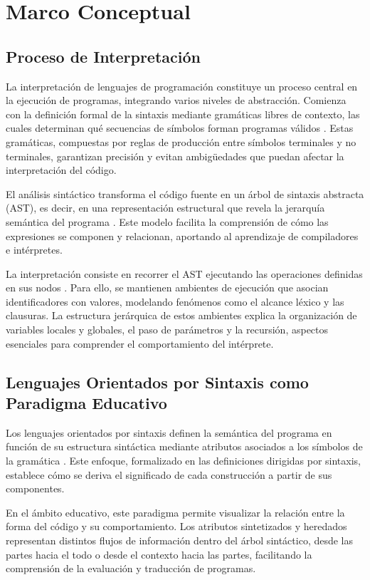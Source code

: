 \section{Marco Conceptual}

\subsection{Proceso de Interpretación}

La interpretación de lenguajes de programación constituye un proceso central en la ejecución de programas, integrando varios niveles de abstracción. Comienza con la definición formal de la sintaxis mediante gramáticas libres de contexto, las cuales determinan qué secuencias de símbolos forman programas válidos \cite{10.5555/1177220}. Estas gramáticas, compuestas por reglas de producción entre símbolos terminales y no terminales, garantizan precisión y evitan ambigüedades que puedan afectar la interpretación del código.

El análisis sintáctico transforma el código fuente en un árbol de sintaxis abstracta (AST), es decir, en una representación estructural que revela la jerarquía semántica del programa \cite{10.5555/1177220}. Este modelo facilita la comprensión de cómo las expresiones se componen y relacionan, aportando al aprendizaje de compiladores e intérpretes.

La interpretación consiste en recorrer el AST ejecutando las operaciones definidas en sus nodos \cite{10.5555/1378240}. Para ello, se mantienen ambientes de ejecución que asocian identificadores con valores, modelando fenómenos como el alcance léxico y las clausuras. La estructura jerárquica de estos ambientes explica la organización de variables locales y globales, el paso de parámetros y la recursión, aspectos esenciales para comprender el comportamiento del intérprete.

\subsection{Lenguajes Orientados por Sintaxis como Paradigma Educativo}

Los lenguajes orientados por sintaxis definen la semántica del programa en función de su estructura sintáctica mediante atributos asociados a los símbolos de la gramática \cite{10.5555/1177220}. Este enfoque, formalizado en las definiciones dirigidas por sintaxis, establece cómo se deriva el significado de cada construcción a partir de sus componentes.

En el ámbito educativo, este paradigma permite visualizar la relación entre la forma del código y su comportamiento. Los atributos sintetizados y heredados representan distintos flujos de información dentro del árbol sintáctico, desde las partes hacia el todo o desde el contexto hacia las partes, facilitando la comprensión de la evaluación y traducción de programas.
